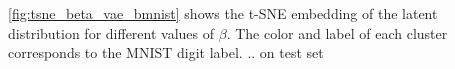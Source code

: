 \autoref{fig:tsne_beta_vae_bmnist} shows the t-SNE embedding of the latent distribution for different values of $\beta$. The color and label of each cluster corresponds to the MNIST digit label. .. on test set

\begin{figure}[!htb]
\centering
{}
\qquad
{}
\qquad

\end{figure}
